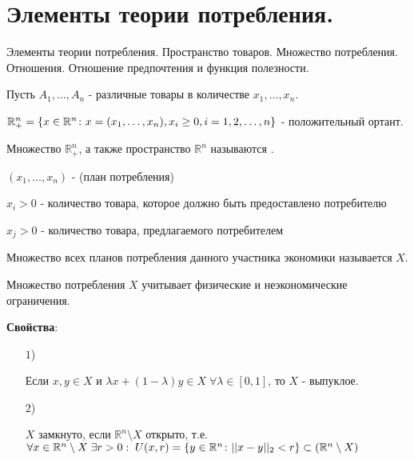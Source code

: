 \chapter{Элементы теории потребления.}\label{cha:1}

Элементы теории потребления. Пространство товаров. Множество потребления. Отношения. Отношение предпочтения и функция полезности.

\vspace{0.5cm}

Пусть $A_1, \dots, A_n$ - различные товары в количестве $x_1, \dots, x_n$.

$\mathbb{R}_{+}^n = \left\{x \in \mathbb{R}^n\colon x = (x_1, \dots, x_n), x_i \ge 0, i = 1,2,\dots,n\right\}$ - положительный ортант.

\begin{definition}\label{cha:1/def:1}
	Множество $\mathbb{R}_{+}^n$, а также пространство $\mathbb{R}^n$ называются .
\end{definition}

\begin{clair}\label{cha:1/clair:1}
	$(x_1, \dots, x_n)$ -  (план потребления)

	$x_i > 0$ - количество товара, которое должно быть предоставлено потребителю

	$x_j > 0$ - количество товара, предлагаемого потребителем
\end{clair}

\begin{definition}\label{cha:1/def:2}
	Множество всех планов потребления данного участника экономики называется  $X$.
\end{definition}

\begin{remark}\label{cha:1/remark:1}
	Множество потребления $X$ учитывает физические и неэкономические ограничения.
\end{remark}

\textbf{Свойства}:
\begin{itemize}
	\item[$1$)]

		Если $x, y \in X$ и $\lambda x + (1-\lambda) y \in X \; \forall \lambda \in [0,1]$, то $X$ - выпуклое.
	\item[$2$)]

		$X$ замкнуто, если $\mathbb{R}^n \setminus X$ открыто, т.е. $\forall x \in \mathbb{R}^n \setminus X \; \exists r > 0: \; U(x, r) = \left\{y \in \mathbb{R}^n\colon||x-y||_2<r\right\} \subset (\mathbb{R}^n \setminus X)$
\end{itemize}

